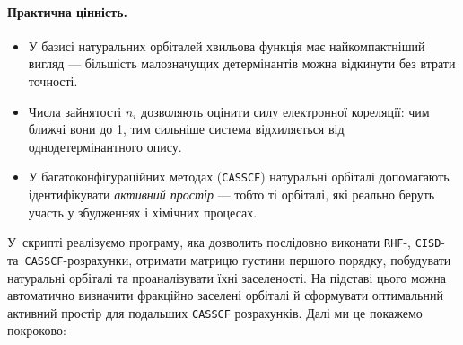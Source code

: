 \paragraph{Практична цінність.}
\begin{itemize}
	\item У базисі натуральних орбіталей хвильова функція має найкомпактніший вигляд ---
	      більшість малозначущих детермінантів можна відкинути без втрати точності.
	\item Числа зайнятості $n_i$ дозволяють оцінити силу електронної кореляції:
	      чим ближчі вони до 1, тим сильніше система відхиляється від однодетермінантного опису.
	\item У багатоконфігураційних методах (\texttt{CASSCF}) натуральні орбіталі
	      допомагають ідентифікувати \emph{активний простір} --- тобто ті орбіталі,
	      які реально беруть участь у збудженнях і хімічних процесах.
\end{itemize}

У~скрипті 
реалізуємо програму, яка дозволить
послідовно виконати \texttt{RHF}-, \texttt{CISD}- та~\texttt{CASSCF}-розрахунки,
отримати матрицю густини першого порядку,
побудувати натуральні орбіталі та проаналізувати їхні заселеності.
На підставі цього можна автоматично визначити
фракційно заселені орбіталі й сформувати оптимальний
активний простір для подальших \texttt{CASSCF} розрахунків. Далі ми це покажемо покроково:

